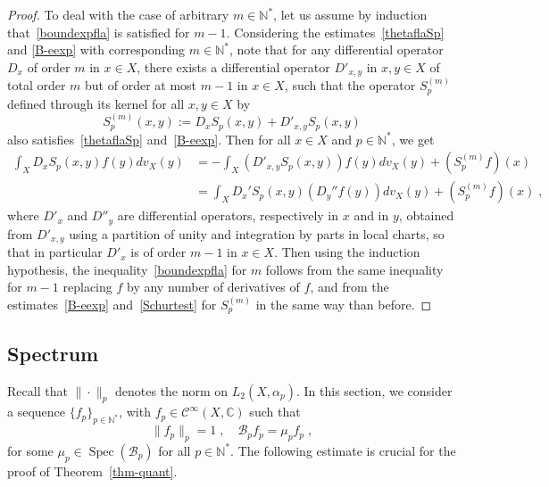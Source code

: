 \documentclass[11pt]{article}
\theoremstyle{definition}
\numberwithin{equation}{section}
\numberwithin{figure}{section}
\numberwithin{table}{section}
\DeclareMathOperator{\Spec}{Spec}
\newcommand{\N}{{\mathbb{N}}}
\newcommand{\CCC}{{\mathbb{C}}}
\newcommand{\CC}{\mathcal{C}}
\newcommand{\cB}{{\mathcal{B}}}
\newcommand\< {\mathcal{h}}
\renewcommand\> {\mathcal{i}}
\newcommand{\cinf}{\CC^\infty}
\begin{document}
\begin{proof}
To deal with the case of arbitrary $m\in\N^*$, let us assume by induction that~\eqref{boundexpfla} is satisfied for $m-1$. Considering the estimates~\eqref{thetaflaSp} and \eqref{B-eexp} with corresponding $m\in\N^*$, note that for any differential operator $D_x$ of order $m$ in $x\in X$, there exists a differential operator $D'_{x,y}$ in $x,y\in X$ of total order $m$ but of order at most $m-1$ in $x\in X$, such that the operator $S_p^{(m)}$ defined through its kernel for all $x,y\in X$ by
\begin{equation}
S_p^{(m)}(x,y):=D_xS_p(x,y)+D'_{x,y}S_p(x,y)
\end{equation}
also satisfies~\eqref{thetaflaSp} and~\eqref{B-eexp}. Then for all $x\in X$ and $p\in\N^*$, we get
\begin{equation}
\begin{split}
\int_X D_xS_p(x,y)f(y)dv_X(y)&= -\int_X\left(D'_{x,y}S_p(x,y)\right)f(y)dv_X(y)+(S_p^{(m)}f)(x)\\
&=\int_XD_x'S_p(x,y)\left(D_y''f(y)\right)dv_X(y)+(S_p^{(m)}f)(x)\;,
\end{split}
\end{equation}
where $D'_x$ and $D''_y$ are differential operators, respectively in $x$ and in $y$, obtained from $D'_{x,y}$ using a partition of unity and integration by parts in local charts, so that in particular $D'_x$ is of order $m-1$ in $x\in X$. Then using the induction hypothesis, the inequality~\eqref{boundexpfla} for $m$ follows from the same inequality for $m-1$ replacing $f$ by any number of derivatives of $f$, and from the estimates~\eqref{B-eexp} and~\eqref{Schurtest} for $S_p^{(m)}$ in the same way than before.
\end{proof}

\subsection{Spectrum}\label{specsec}

Recall that $\|\cdot\|_p$ denotes the norm on $L_2(X,\alpha_p)$. In this section, we consider a sequence $\{f_p\}_{p\in\N^*}$, with $f_p\in\cinf(X,\CCC)$ such that
\begin{equation}\label{efBp}
\|f_p\|_p=1\;,\quad \cB_pf_p=\mu_p f_p\;,
\end{equation}
for some $\mu_p\in\Spec(\cB_p)$ for all $p\in\N^*$. The following estimate is crucial for the proof of Theorem~\ref{thm-quant}.
\end{document}
